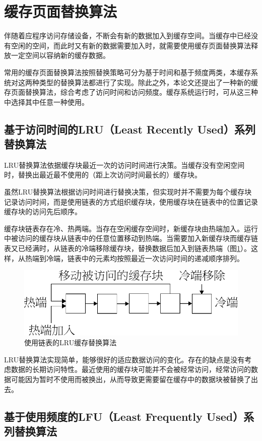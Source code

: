 \section{缓存页面替换算法}
\label{sec:cache_algorithm}

伴随着应程序访问存储设备，不断会有新的数据加入到缓存空间。当缓存中已经没有空闲的空间，而此时又有新的数据需要加入时，就需要使用缓存页面替换算法释放一定空间以容纳新的缓存数据。

常用的缓存页面替换算法按照替换策略可分为基于时间和基于频度两类，本缓存系统对这两种类型的替换算法都进行了实现。除此之外，本论文还提出了一种新的缓存页面替换算法，综合考虑了访问时间和访问频度。缓存系统运行时，可从这三种中选择其中任意一种使用。

\subsection{基于访问时间的LRU（Least Recently Used）系列替换算法}

LRU替换算法\cite{LRU}依据缓存块最近一次的访问时间进行决策。当缓存没有空闲空间时，替换出最近最不使用的（距上次访问时间最长的）缓存块。

虽然LRU替换算法根据访问时间进行替换决策，但实现时并不需要为每个缓存块记录访问时间，而是使用链表的方式组织缓存块，使用缓存块在链表中的位置记录缓存块的访问先后顺序。

缓存块链表存在冷、热两端。当存在空闲缓存空间时，新缓存块由热端加入。运行中被访问的缓存块从链表中的任意位置移动到热端。当需要加入新缓存块而缓存链表又已经满时，从链表的冷端移除缓存块，替换数据后加入到链表热端（图\ref{fig:replace-algo-lru}）。这样，从热端到冷端，链表中的元素均按照最近一次访问时间的递减顺序排列。

\begin{figure}[H]
\centering
\includegraphics[width=0.6\linewidth]{./graph/replace-algo-lru}
\caption{使用链表的LRU缓存替换算法}
\label{fig:replace-algo-lru}
\end{figure}

LRU替换算法实现简单，能够很好的适应数据访问的变化。存在的缺点是没有考虑数据的长期访问特性。最近使用的缓存块可能并不会被经常访问，经常访问的数据可能因为暂时不使用而被换出，从而导致更需要留在缓存中的数据块被替换了出去。

\subsection{基于使用频度的LFU（Least Frequently Used）系列替换算法}

